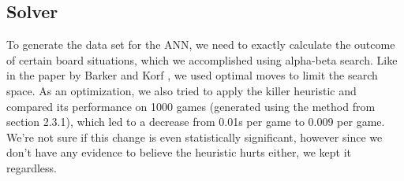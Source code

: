 \subsection{Solver}

To generate the data set for the ANN, we need to exactly calculate the outcome of certain board situations, which we accomplished using alpha-beta search. Like in the paper by Barker and Korf \cite{Barker:2012:SD:2900728.2900788}, we used optimal moves to limit the search space. As an optimization, we also tried to apply the killer heuristic \cite{killerHeuristic} and compared its performance on 1000 games (generated using the method from section 2.3.1), which led to a decrease from 0.01s per game to 0.009 per game. We're not sure if this change is even statistically significant, however since we don't have any evidence to believe the heuristic hurts either, we kept it regardless.